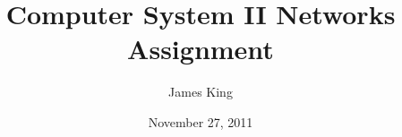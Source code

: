 \documentclass[a4paper]{article}
\title{Computer System II Networks Assignment}
\date{November 27, 2011}
\author{James King}
\begin{document}
	\maketitle
	\lipsum
\end{document}
